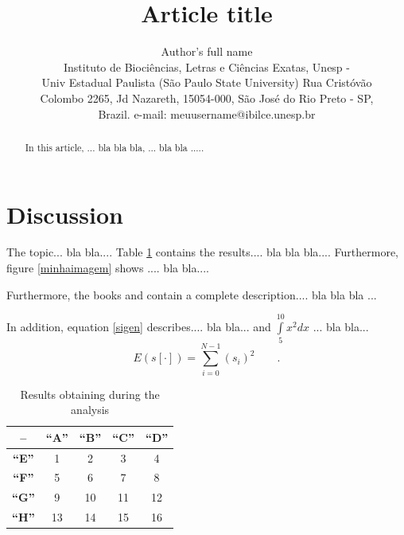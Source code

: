 \documentclass[a4paper,times,12pt]{article}
\begin{document}
\title{Article title}
\author{Author's full name \\ Instituto de Bioci\^{e}ncias, Letras e Ci\^{e}ncias Exatas, Unesp - \\ Univ Estadual Paulista (S\~{a}o Paulo State University) Rua Crist\'{o}v\~{a}o \\ Colombo 2265, Jd Nazareth, 15054-000, S\~{a}o Jos\'{e} do Rio Preto - SP, \\ Brazil. \quad e-mail: meuusername@ibilce.unesp.br}
\maketitle
\begin{abstract}
In this article, ... bla bla bla, ... bla bla ..... 
\end{abstract}
\section{Discussion}
\hspace*{+15pt} The topic... bla bla.... Table \ref{tabresult} contains the results.... bla bla bla.... Furthermore, figure \ref{minhaimagem} shows .... bla bla....
\\
\par Furthermore, the books \cite{livro_de_c} and \cite{livro_de_processamento_de_sinais} contain a complete description....  bla bla bla ... 
\\
\par In addition, equation \ref{sigen} describes.... bla bla... and $\int\limits_{5}^{10}x^{2} dx$ ... bla bla...
\begin{equation}
E(s[\cdot]) = \sum\limits_{i=0}^{N-1} {(s_i)}^2 \qquad . 
\label{sigen}
\end{equation}

\begin{table}[H]
\centering
\caption{Results obtaining during the analysis}
\begin{tabular}{|c|||c|c|c|c|}
\hline
\textbf{--}&\textbf{``A''}&\textbf{``B''}&\textbf{``C''}&\textbf{``D''}\\
\hline
\hline
\hline
\textbf{``E''}&1&2&3&4\\
\hline
\textbf{``F''}&5&6&7&8\\
\hline
\textbf{``G''}&9&10&11&12\\
\hline
\textbf{``H''}&13&14&15&16\\
\hline
\end{tabular}
\label{tabresult}
\end{table}
\end{document}
